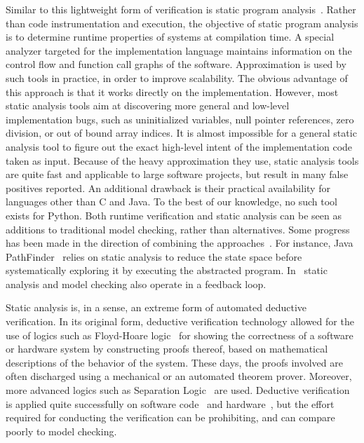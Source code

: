 \documentclass[sort&compress,preprint,3p]{elsarticle}
\begin{document}
Similar to this lightweight form of verification is static program
analysis~\cite{Schmidt98programanalysis}. Rather than code instrumentation and
execution, the objective of 
static program analysis is to determine runtime properties of systems at
compilation time.
A special analyzer targeted for the implementation language maintains
information on the control flow and function call graphs
of the software. Approximation is used by such tools in practice, in order to
improve scalability. The obvious advantage
of this approach is that it works directly on the implementation. However, most
static analysis tools aim at discovering 
more general and low-level implementation bugs, such as uninitialized variables, null
pointer references, zero division, or out of bound array indices. 
It is almost impossible for a general static analysis tool to
figure out the exact high-level intent of the implementation code taken as input.
Because of the heavy
approximation they use,
static analysis tools are quite fast and applicable to large software projects,
but result in many false positives reported. 
An additional drawback
is their 
practical availability for languages other than C and Java. To the best of our
knowledge, no such tool exists for Python. Both runtime verification and static
analysis can be seen as additions to
traditional model checking, rather than alternatives. Some progress has been 
made in the direction of combining the
approaches~\cite{Java_PathFinder,Linux_driver,Brat01combiningstatic}. For
instance, Java PathFinder~\cite{Java_PathFinder}
relies on static analysis to reduce the state space before systematically
exploring it by executing the abstracted program.
In~\cite{Brat01combiningstatic}
static analysis and model checking also operate in a feedback loop. 

Static analysis is, in a sense, an extreme form of automated deductive
verification.  In its original form, deductive verification technology
allowed for the use of logics such as Floyd-Hoare logic~\cite{Hoa:69} for
showing the correctness of a software or hardware system by constructing
proofs thereof, based on mathematical descriptions of the behavior of
the system.  These days, the proofs involved are often discharged using a
mechanical or an automated theorem prover. Moreover, more advanced logics
such as Separation Logic~\cite{Rey:02} are used. Deductive verification
is applied quite successfully on software code~\cite{PMSJP:12,KAE+:10}
and hardware~\cite{AATH:10}, but the effort required for conducting the
verification can be prohibiting, and can compare poorly to model checking.
\end{document}
